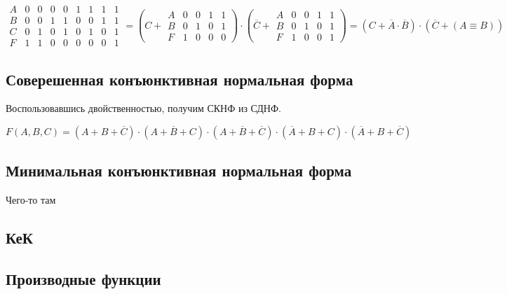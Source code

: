 \documentclass[a4paper,10pt]{article} %
\begin{document}
	\begin{equation}
		\begin{smallmatrix}
			A & 0 & 0 & 0 & 0 & 1 & 1 & 1 & 1 \\
			B & 0 & 0 & 1 & 1 & 0 & 0 & 1 & 1 \\
			C & 0 & 1 & 0 & 1 & 0 & 1 & 0 & 1 \\
			F & 1 & 1 & 0 & 0 & 0 & 0 & 0 & 1
		\end{smallmatrix}
		= \left( C + 
		\begin{smallmatrix}
			A & 0 & 0 & 1 & 1 \\
			B & 0 & 1 & 0 & 1 \\
			F & 1 & 0 & 0 & 0
		\end{smallmatrix}
		\right) \cdot \left( \overline{C} +
		\begin{smallmatrix}
			A & 0 & 0 & 1 & 1 \\
			B & 0 & 1 & 0 & 1 \\
			F & 1 & 0 & 0 & 1 
		\end{smallmatrix}
		\right) = (C + \overline{A} \cdot \overline{B}) \cdot
		 (\overline{C} + (A \equiv B)) 
	\end{equation}

	\subsection{Соверешенная конъюнктивная нормальная форма}
	
	Воспользовавшись двойственностью, получим СКНФ из СДНФ.
	
	\begin{equation}
		F(A, B, C) = (A + B + \overline{C}) \cdot 
		(A + \overline{B} + C) \cdot (A + \overline{B} + \overline{C}) \cdot
		(\overline{A} + B + C) \cdot (\overline{A} + B + \overline{C})
	\end{equation}
	
	\subsection{Минимальная конъюнктивная нормальная форма}
	Чего-то там
	
	\subsection{КеК}
	
	\subsection{Производные функции}
	
\end{document}

